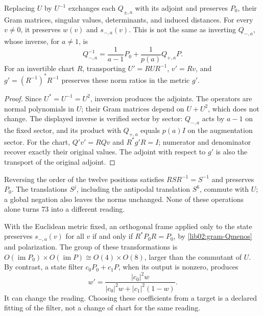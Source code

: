 \begin{proposition}
\label{lib02:inversion-carta}
Replacing \(U\) by \(U^{-1}\) exchanges each \(Q_{\pm,a}\) with its adjoint and preserves \(P_0\), their Gram matrices, singular values, determinants, and induced distances. For every \(v\ne0\), it preserves \(w(v)\) and \(s_{-,a}(v)\). This is not the same as inverting \(Q_{-,a}\), whose inverse, for \(a\ne1\), is
\begin{equation}
 Q_{-,a}^{-1}
 =\frac1{a-1}P_0+\frac1{p(a)}Q_{+,a}P.
 \label{lib02:inversa-Q}
\end{equation}
For an invertible chart \(R\), transporting \(U'=RUR^{-1}\), \(v'=Rv\), and \(g'=(R^{-1})^*R^{-1}\) preserves these norm ratios in the metric \(g'\).
\end{proposition}
\begin{proof}
Since \(U^*=U^{-1}=U^2\), inversion produces the adjoints. The operators are normal polynomials in \(U\); their Gram matrices depend on \(U+U^2\), which does not change. The displayed inverse is verified sector by sector: \(Q_{-,a}\) acts by \(a-1\) on the fixed sector, and its product with \(Q_{+,a}\) equals \(p(a)I\) on the augmentation sector. For the chart, \(Q'v'=RQv\) and \(R^*g'R=I\); numerator and denominator recover exactly their original values. The adjoint with respect to \(g'\) is also the transport of the original adjoint.
\end{proof}

Reversing the order of the twelve positions satisfies \(RSR^{-1}=S^{-1}\) and preserves \(P_0\). The translations \(S^j\), including the antipodal translation \(S^6\), commute with \(U\); a global negation also leaves the norms unchanged. None of these operations alone turns 73 into a different reading.

With the Euclidean metric fixed, an orthogonal frame applied only to the state preserves \(s_{-,a}(v)\) for all \(v\) if and only if \(R^*P_0R=P_0\), by \eqref{lib02:gram-Qmenos} and polarization. The group of these transformations is \(O(\operatorname{im}P_0)\times O(\operatorname{im}P)
\cong O(4)\times O(8)\), larger than the commutant of \(U\). By contrast, a state filter \(c_0P_0+c_1P\), when its output is nonzero, produces
\begin{equation}
 w'=
 \frac{|c_0|^2w}{|c_0|^2w+|c_1|^2(1-w)}.
 \label{lib02:filtro-pesos}
\end{equation}
It can change the reading. Choosing these coefficients from a target is a declared fitting of the filter, not a change of chart for the same reading.

